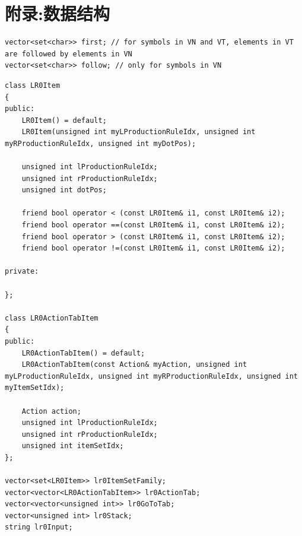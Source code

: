 \documentclass[11pt]{article}
\begin{document}
\section{附录:数据结构} \label{sec: datastructure}
\begin{center}
\begin{lstlisting}[caption = {FIRST和FOLLOW集合数据结构}, label = {lst: firstfollow}]
vector<set<char>> first; // for symbols in VN and VT, elements in VT are followed by elements in VN
vector<set<char>> follow; // only for symbols in VN
\end{lstlisting}
\end{center}
\begin{center}
\begin{lstlisting}[caption = {SLR(1)分析器数据结构}, label = {lst: lr0}]
class LR0Item
{
public:
	LR0Item() = default;
	LR0Item(unsigned int myLProductionRuleIdx, unsigned int myRProductionRuleIdx, unsigned int myDotPos);

	unsigned int lProductionRuleIdx;
	unsigned int rProductionRuleIdx;
	unsigned int dotPos;

	friend bool operator < (const LR0Item& i1, const LR0Item& i2);
	friend bool operator ==(const LR0Item& i1, const LR0Item& i2);
	friend bool operator > (const LR0Item& i1, const LR0Item& i2);
	friend bool operator !=(const LR0Item& i1, const LR0Item& i2);

private:

};

class LR0ActionTabItem
{
public:
	LR0ActionTabItem() = default;
	LR0ActionTabItem(const Action& myAction, unsigned int myLProductionRuleIdx, unsigned int myRProductionRuleIdx, unsigned int myItemSetIdx);

	Action action;
	unsigned int lProductionRuleIdx;
	unsigned int rProductionRuleIdx;
	unsigned int itemSetIdx;
};

vector<set<LR0Item>> lr0ItemSetFamily;
vector<vector<LR0ActionTabItem>> lr0ActionTab;
vector<vector<unsigned int>> lr0GoToTab;
vector<unsigned int> lr0Stack;
string lr0Input;
\end{lstlisting}
\end{center}
\end{document}
